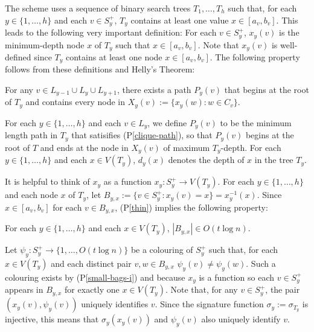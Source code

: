 \documentclass{patmorin}
\newcommand{\pref}[1]{(P\ref{#1})}
\begin{document}
The scheme uses a sequence of binary search trees $T_1,\ldots,T_h$ such that, for each $y\in\{1,\ldots,h\}$ and each $v\in S^+_y$, $T_y$ contains at least one value $x\in [a_v,b_v]$.  This leads to the following very important definition: For each $v\in S^+_y$, $x_{y}(v)$ is the minimum-depth node $x$ of $T_y$ such that $x\in [a_v,b_v]$. Note that $x_y(v)$ is well-defined since $T_y$ contains at least one node $x\in[a_v,b_v]$.   The following property follows from these definitions and Helly's Theorem:

\begin{compactenum}[(P1)]\setcounter{enumi}{1}
    \item For any $v\in L_{y-1}\cup L_y\cup L_{y+1}$, there exists a path $P_y(v)$ that begins at the root of $T_y$ and contains every node in $X_y(v):=\{x_{y}(w): w\in C_v\}$.\label{clique-path}
\end{compactenum}

For each $y\in\{1,\ldots,h\}$ and each $v\in L_y$, we define $P_y(v)$ to be the minimum length path in $T_y$ that satisifies \pref{clique-path}, so that $P_y(v)$ begins at the root of $T$ and ends at the node in $X_y(v)$ of maximum $T_y$-depth. For each $y\in\{1,\ldots,h\}$ and each $x\in V(T_y)$, $d_y(x)$ denotes the depth of $x$ in the tree $T_y$.

It is helpful to think of $x_y$ as a function $x_y:S^+_y\to V(T_y)$.  For each $y\in\{1,\ldots,h\}$ and each node $x$ of $T_y$, let $B_{y,x}:=\{v\in S^+_y: x_y(v)=x\}=x_y^{-1}(x)$.  Since $x\in[a_v,b_v]$ for each $v\in B_{y,x}$, \pref{thin} implies the following property:

\begin{compactenum}[(P1)]\setcounter{enumi}{2}
    \item For each $y\in\{1,\ldots,h\}$ and each $x\in V(T_y)$, $|B_{y,x}|\in O(t\log n)$.\label{small-bags-i}
\end{compactenum}

Let $\psi_y:S^+_y\to\{1,\ldots,O(t\log n)\}$ be a colouring of $S^+_y$ such that, for each $x\in V(T_y)$ and each distinct pair $v,w\in B_{y,x}$ $\psi_y(v)\neq\psi_y(w)$.  Such a colouring exists by \pref{small-bags-i} and because $x_y$ is a function so each $v\in S^+_y$ appears in $B_{y,x}$ for exactly one $x\in V(T_y)$.  Note that, for any $v\in S^+_y$, the pair $(x_y(v), \psi_y(v))$ uniquely identifies $v$.  Since the signature function $\sigma_y:=\sigma_{T_y}$ is injective, this means that $\sigma_y(x_y(v))$ and $\psi_y(v)$ also uniquely identify $v$.
\end{document}
